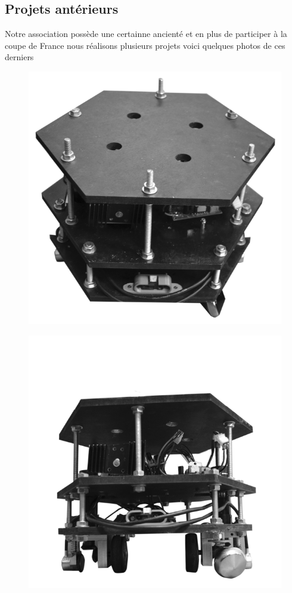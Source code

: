\documentclass[a4paper,10pt]{article}
\begin{document}
\begin{spacing}{1.5}
\newpage
\section{Projets antérieurs}
Notre association possède une certainne ancienté et en plus de participer à la
coupe de France nous réalisons plusieurs projets voici quelques photos de ces
derniers
\begin{multicols}{2}
  \begin{figure}[H]
    \center
    \includegraphics[scale=0.3]{1A2018.png}
  \end{figure}
  \columnbreak
  \begin{figure}[H]
    \center
    \includegraphics[scale=0.3]{1A2018(2).png}
  \end{figure}
\end{multicols}


\end{spacing}
\end{document}
